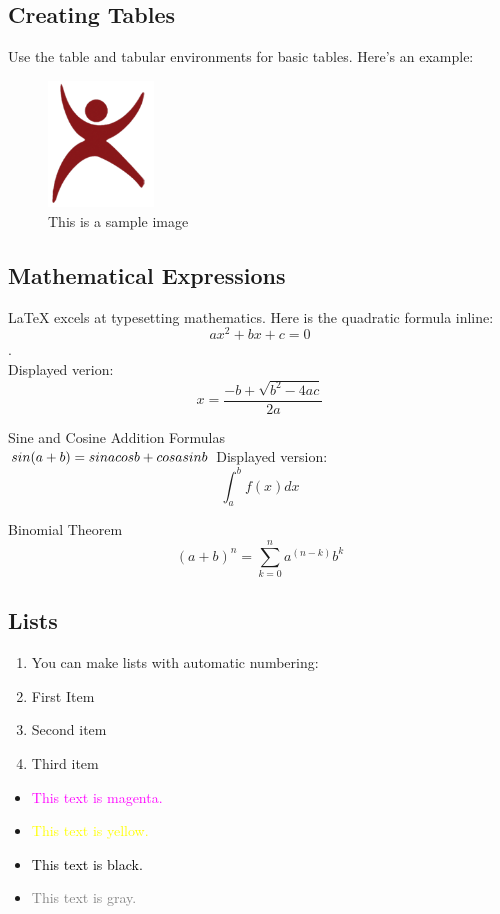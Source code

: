 \documentclass{article}
\begin{document}
	\subsection{Creating Tables}
	Use the table and tabular environments for basic tables. Here’s an example:
	\begin{figure}[h]
		\centering
		\includegraphics[width=0.25\textwidth]{logo.png} 
		\caption{This is a sample image}
	\end{figure}
	\subsection{Mathematical Expressions}
	LaTeX excels at typesetting mathematics. Here is the quadratic formula inline: \[ax^2 + bx + c = 0\]. \\
	Displayed verion: \\
	\[x = \frac{-b + \sqrt{b^2-4ac}}{2a}\] 
	
	Sine and Cosine Addition Formulas  \\
	\begin{math}
	 	sin(a + b) = sinacosb + cosasinb  \\	
	\end{math}
	Displayed version: \\
	\[\int_{a}^{b}f(x)dx\]
	
	Binomial Theorem \\
	\[(a+b)^n = \sum_{k=0}^{n}a^(n-k)b^k\]
	
	\subsection{Lists}
	\begin{enumerate}
	    \item You can make lists with automatic numbering:
		\item First Item
		\item Second item
		\item Third item
	\end{enumerate}
	\begin{itemize}
		\item \textcolor{magenta}{This text is magenta.}
		\item \textcolor{yellow}{This text is yellow.}
		\item \textcolor{black}{This text is black.}
		\item \textcolor{gray}{This text is gray.}
	\end{itemize}
	
\end{document}

